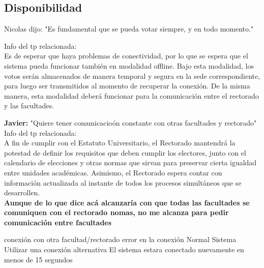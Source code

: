 \subsection{Disponibilidad}
Nicolas dijo:
"Es fundamental que se pueda votar siempre, y en todo momento."


Info del tp relacionada:
\\
Es de esperar que haya problemas de conectividad, por lo que se espera que el sistema
pueda funcionar también en modalidad offline. Bajo esta modalidad, los votos serán
almacenados de manera temporal y segura en la sede correspondiente, para luego ser
transmitidos al momento de recuperar la conexión. De la misma manera, esta modalidad
deberá funcionar para la comunicación entre el rectorado y las facultades.


\textbf{Javier:}
"Quiere tener comunicacio\'on constante con otras facultades y rectorado"
\\
Info del tp relacionada:
\\
A fin de cumplir con el Estatuto Universitario, el Rectorado mantendrá la potestad de
definir los requisitos que deben cumplir los electores, junto con el calendario de elecciones
y otras normas que sirvan para preservar cierta igualdad entre unidades académicas.
Asimismo, el Rectorado espera contar con información actualizada al instante de todos
los procesos simultáneos que se desarrollen.
\\
\textbf{Aunque de lo que dice ac\'a alcanzar\'ia con que todas las facultades se comuniquen con el rectorado nomas, no me alcanza para pedir comunicaci\'on entre facultades}


{conexi\'on con otra facultad/rectorado}
{error en la conexi\'on}
{Normal}
{Sistema}
{Utilizar una conexi\'on alternativa}
{El sistema estara conectado nuevamente en menos de 15 segundos}

